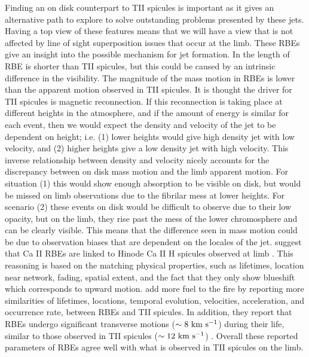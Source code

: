 \documentclass[12pt]{ociamthesis}
\newcommand{\kms}{~\rm{km ~s^{-1}}}
\newcommand{\np}{\\ \\}
\begin{document}
Finding an on disk counterpart to TII spicules is important as it gives an alternative path to explore to solve outstanding problems presented by these jets. Having a top view of these features means that we will have a view that is not affected by line of sight superposition issues that occur at the limb. These RBEs give an insight into the possible mechanism for jet formation. In \cite{Langangen2008ApJ} the length of RBE is shorter than TII spicules, but this could be caused by an intrinsic difference in the visibility. The magnitude of the mass motion in RBEs is lower than the apparent motion observed in TII spicules. It is thought the driver for TII spicules is magnetic reconnection. If this reconnection is taking place at different heights in the atmosphere, and if the amount of energy is similar for each event, then we would expect the density and velocity of the jet to be dependent on height; i.e. (1) lower heights would give high density jet with low velocity, and (2) higher heights give a low density jet with high velocity. This inverse relationship between density and velocity nicely accounts for the discrepancy between on disk mass motion and the limb apparent motion. For situation (1) this would show enough absorption to be visible on disk, but would be missed on limb observations due to the fibrilar mess at lower heights. For scenario (2) these events on disk would be difficult to observe due to their low opacity, but on the limb, they rise past the mess of the lower chromosphere and can be clearly visible. This means that the difference seen in mass motion could be due to observation biases that are dependent on the locales of the jet. \cite{Langangen2008ApJ} suggest that Ca II RBEs are linked to Hinode Ca II H spicules observed at limb \cite{Pontieu2007PASJ}. This reasoning is based on the matching physical properties, such as lifetimes, location near network, fading, spatial extent, and the fact that they only show blueshift which corresponds to upward motion. \cite{Rouppe2009ApJ} add more fuel to the fire by reporting more similarities of lifetimes, locations, temporal evolution, velocities, acceleration, and occurrence rate, between RBEs and TII spicules. In addition, they report that RBEs undergo significant transverse motions ($\sim 8\kms$) during their life, similar to those observed in TII spicules ($\sim 12\kms$) \citep{De_Pontieu2007}. Overall these reported parameters of RBEs agree well with what is observed in TII spicules on the limb. \np
\end{document}
